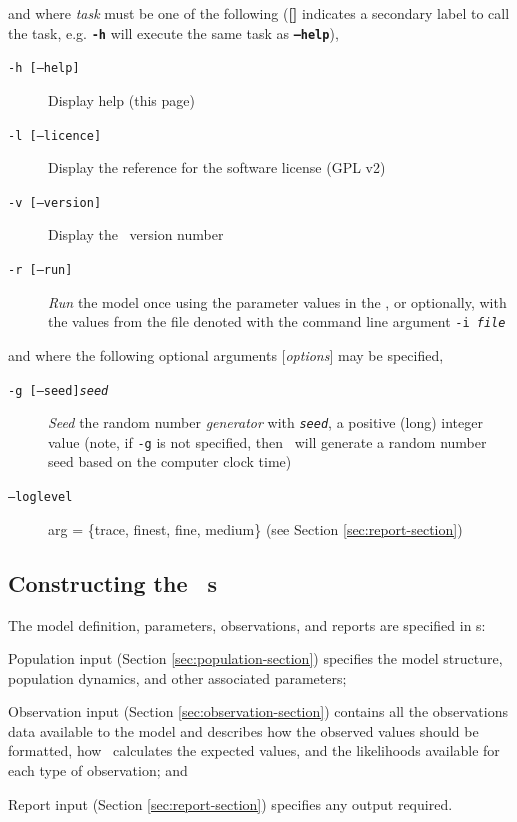 and where \emph{task} must be one of the following (\textbf{[]} indicates a secondary label to call the task, e.g. \textbf{\texttt{-h}} will execute the same task as \textbf{\texttt{--help}}),

\begin{description}
\item [\texttt{-h [--help]}] Display help (this page)
\item [\texttt{-l [--licence]}] Display the reference for the software license (GPL v2)
\item [\texttt{-v [--version]}] Display the \IBM\ version number

\item [\texttt{-r [--run]}] \emph{Run} the model once using the parameter values in the \config, or optionally, with the values from the file denoted with the command line argument \texttt{-i \emph{file}}

\end{description}

and where the following optional arguments [\emph{options}] may be specified,

\begin{description}
\item [\texttt{-g [--seed]\emph{seed}}]  \emph{Seed} the random number \emph{generator} with \texttt{\emph{seed}}, a positive (long) integer value (note, if \texttt{-g} is not specified, then \IBM\ will  generate a random number seed based on the computer clock time)

\item [\texttt{--loglevel}] arg = \{trace, finest, fine, medium\} (see Section \ref{sec:report-section})
\end{description}

\subsection{Constructing the \IBM\ \config s \label{constructing-config}}

The model definition, parameters, observations, and reports are specified in \config s:
 
\begin{description}

\item Population input (Section \ref{sec:population-section}) specifies the model structure, population dynamics, and other associated parameters;
\item Observation input (Section \ref{sec:observation-section}) contains all the observations data available to the model and  describes how the observed values should be formatted, how \IBM\ calculates the expected values, and the likelihoods available for each type of observation; and
\item Report input (Section \ref{sec:report-section}) specifies any output required.
\end{description}

